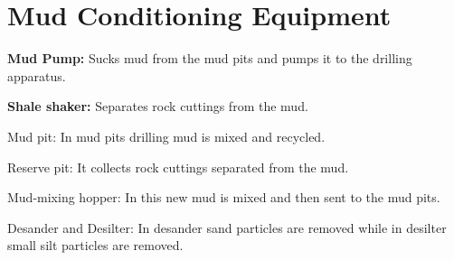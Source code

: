 \chapter{Mud Conditioning Equipment}

\textbf{Mud Pump:} Sucks mud from the mud pits and pumps it to the drilling apparatus.

\vspace{1em}

\textbf{Shale shaker:} Separates rock cuttings from the mud.

\vspace{1em}

Mud pit: In mud pits drilling mud is mixed and recycled. 

\vspace{1em}

Reserve pit: It collects rock cuttings separated from the mud.

\vspace{1em}

Mud-mixing hopper: In this new mud is mixed and then sent to the mud pits.

\vspace{1em}

Desander and Desilter: In desander sand particles are removed while in desilter small silt particles are removed.

